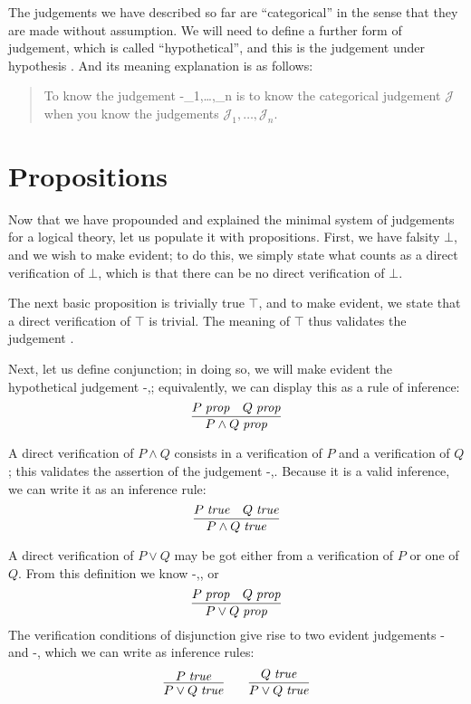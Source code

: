 \documentclass[main.tex]{subfiles}
\begin{document}
The judgements we have described so far are ``categorical'' in the sense that
they are made without assumption. We will need to define a further form of
judgement, which is called ``hypothetical'', and this is the judgement under
hypothesis . And
its meaning explanation is as follows:

\begin{quote}
  To know the judgement \hyp{}{_1,\dots,_n} is to know the
  categorical judgement $\mathcal{J}$ when you know the judgements
  $\mathcal{J}_1,\dots,\mathcal{J}_n$.
\end{quote}


\section{Propositions}
Now that we have propounded and explained the minimal system of judgements for
a logical theory, let us populate it with propositions. First, we have falsity
$\bot$, and we wish to make \isprop{\bot} evident; to do this, we simply state
what counts as a direct verification of $\bot$, which is that there can be no
direct verification of $\bot$.

The next basic proposition is trivially true $\top$, and to make \isprop{\top}
evident, we state that a direct verification of $\top$ is trivial. The meaning
of $\top$ thus validates the judgement \istrue{\top}.

Next, let us define conjunction; in doing so, we will make evident the
hypothetical judgement \hyp{}{,};
equivalently, we can display this as a rule of inference:
\[
  \infer{
    \isprop{P\land Q}
  }{
    \isprop{P} &
    \isprop{Q}
  }
\]

A direct verification of $P\land Q$ consists in a verification of $P$
and a verification of $Q$; this validates the assertion of the judgement
\hyp{}{,}. Because it is a valid
inference, we can write it as an inference rule:
\[
  \infer{
    \istrue{P\land Q}
  }{
    \istrue{P} &
    \istrue{Q}
  }
\]

A direct verification of $P\lor Q$ may be got either from a verification
of $P$ or one of $Q$. From this definition we know \hyp{}{,}, or
\[
  \infer{
    \isprop{P\lor Q}
  }{
    \isprop{P} &
    \isprop{Q}
  }
\]
The verification conditions of disjunction give
rise to two evident judgements \hyp{}{} and
\hyp{}{}, which we can write as inference rules:
\begin{gather*}
  \infer{
    \istrue{P\lor Q}
  }{
    \istrue{P}
  }
  \qquad
  \infer{
    \istrue{P\lor Q}
  }{
    \istrue{Q}
  }
\end{gather*}
\end{document}
